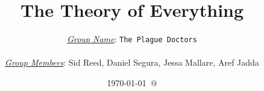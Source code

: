 \documentclass[12pt]{article}
\title{The Theory of Everything}
\author{
\underline{\emph{Group Name}}: \texttt{{\color{blue}The Plague Doctors}}\\\\
\underline{\emph{Group Members}}: {\color{blue}Sid Reed, Daniel Segura, Jessa Mallare, Aref Jadda}}
\date{\today\ @ \thistime}
\begin{document}
\linenumbers
\maketitle

\tableofcontents




\printbibliography
\end{document}

